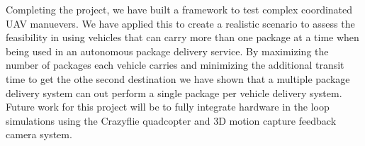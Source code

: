 Completing the project, we have built a framework to test complex coordinated UAV manuevers. We have applied this to create a realistic scenario to assess the feasibility in using vehicles that can carry more than one package at a time when being used in an autonomous package delivery service. By maximizing the number of packages each vehicle carries and minimizing the additional transit time to get the othe second destination we have shown that a multiple package delivery system can out perform a single package per vehicle delivery system. Future work for this project will be to fully integrate hardware in the loop simulations using the Crazyflie quadcopter and 3D motion capture feedback camera system.